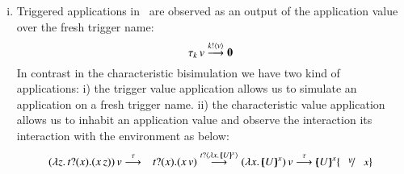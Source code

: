 \begin{enumerate}[i)]
	\item 	Triggered applications in~\cite{JeffreyR05}
		are observed as an output of the application
		value over the fresh trigger name:
		\[
			\tau_k\,v \stackrel{k ! \langle v \rangle}{\longrightarrow} \mathbf{0}
		\]
		In contrast in the characteristic bisimulation
		we have two kind of applications:
		i) the trigger value application allows us
		to simulate an application on a fresh trigger name.
		ii) the characteristic value application
		allows us to inhabit an application value 
		and observe the interaction its interaction
		with the environment as below: 
		\begin{eqnarray*}
			\appl{(\abs{z}{\binp{t}{x} (\appl{x}{z})})}{v} &\by{\tau}& \binp{t}{x} (\appl{x}{v})
			\by{\bactinp{t}{\abs{x}{\mapchar{U}{x}}}}
			\appl{(\abs{x}{\mapchar{U}{x}})}{v}
			\by{\tau} \mapchar{U}{x} \subst{v}{x}
		\end{eqnarray*}
\end{enumerate}



